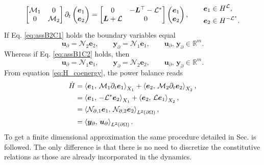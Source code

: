 \begin{equation}
	\label{eq:pHsys_dyn_linass} 
	\begin{bmatrix}
	\mathcal{M}_1 & 0 \\
	0 & \mathcal{M}_2 \\
	\end{bmatrix}
	\partial_t \begin{pmatrix}
	\bm{e}_1 \\ \bm{e}_2
	\end{pmatrix} = \begin{bmatrix}
	0 & -\bm{L}^\top - \mathcal{L}^* \\
	\bm{L} + \mathcal{L} & 0 \\
	\end{bmatrix}\begin{pmatrix}
	\bm{e}_1 \\ \bm{e}_2
	\end{pmatrix} , \qquad \begin{aligned}
	\bm{e}_1 &\in H^{\mathcal{L}}, 	\\
	\bm{e}_2 &\in H^{-\mathcal{L}^*}.
	\end{aligned}\\
\end{equation}
If Eq. \eqref{eq:assB2C1} holds the boundary variables equal 
\begin{equation}
\bm{u}_\partial = \mathcal{N}_2 \displaystyle \bm{e}_2, \qquad  \bm{y}_\partial = \mathcal{N}_1 \displaystyle \bm{e}_1, \qquad  \bm{u}_\partial,\, \bm{y}_\partial \in \mathbb{R}^m.
\end{equation}
Whereas if Eq. \eqref{eq:assB1C2} holds, then
\begin{equation}
\bm{u}_\partial = \mathcal{N}_1 \displaystyle \bm{e}_1, \qquad 
\bm{y}_\partial = \mathcal{N}_2 \displaystyle \bm{e}_2, \qquad  \bm{u}_\partial,\, \bm{y}_\partial \in \mathbb{R}^m. 
\end{equation}
From equation \eqref{eq:H_coenergy}, the power balance reads
\begin{equation}\label{eq:powbal_lin}
\begin{aligned}
\dot{H} &= \inner[X_1]{\bm{e}_1}{\mathcal{M}_1 \partial_{t} \bm{e}_1} + \inner[X_2]{\bm{e}_2}{\mathcal{M}_2 \partial_{t} \bm{e}_2}, \\
&=\inner[X_1]{\bm{e}_1}{-\mathcal{L}^* \bm{e}_2} + \inner[X_2]{\bm{e}_2}{\mathcal{L} \bm{e}_1}, \\
&= \inner[L^2(\partial \Omega)]{\mathcal{N}_{\partial, 1} \bm{e}_1}{\mathcal{N}_{\partial, 2} \bm{e}_2}, \\
&= \inner[L^2(\partial \Omega)]{\bm{y}_\partial}{\bm{u}_\partial}.
\end{aligned}
\end{equation}
To get a finite dimensional approximation the same procedure detailed in Sec.  is followed. The only difference is that there is no need to discretize the constitutive relations as those are already incorporated in the dynamics. 

